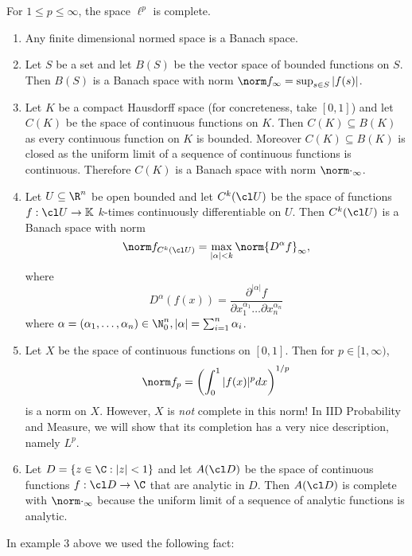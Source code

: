 \documentclass[a4paper]{article}
\newcommand{\K}{{\mathbb{K}}} %
\begin{document}
\begin{ex}
  For \(1 \leq p \leq \infty\), the space \(\ell^p\) is complete.
\end{ex}

\begin{eg}\leavevmode
  \begin{enumerate}
  \item Any finite dimensional normed space is a Banach space.
  \item Let \(S\) be a set and let \(B(S)\) be the vector space of bounded functions on \(S\). Then \(B(S)\) is a Banach space with norm \(\norm f_\infty = \sup_{s \in S} |f(s)|\).
  \item Let \(K\) be a compact Hausdorff space (for concreteness, take \([0, 1]\)) and let \(C(K)\) be the space of continuous functions on \(K\). Then \(C(K) \subseteq B(K)\) as every continuous function on \(K\) is bounded. Moreover \(C(K) \subseteq B(K)\) is closed as the uniform limit of a sequence of continuous functions is continuous. Therefore \(C(K)\) is a Banach space with norm \(\norm \cdot_\infty\).
  \item Let \(U \subseteq \R^n\) be open bounded and let \(C^k(\cl U)\) be the space of functions \(f: \cl U \to \K\) \(k\)-times continuously differentiable on \(U\). Then \(C^k(\cl U)\) is a Banach space with norm
    \[
      \norm f_{C^k(\cl U)} = \max_{|\alpha| < k} \norm{D^\alpha f}_\infty,
    \]
    where
    \[
      D^\alpha(f(x)) = \frac{\partial^{|\alpha|} f}{\partial x_1^{\alpha_1} \dots \partial x_n^{\alpha_n}}
    \]
    where \(\alpha = (\alpha_1, \dots, \alpha_n) \in \N_0^n, |\alpha| = \sum_{i = 1}^n \alpha_i\).
  \item Let \(X\) be the space of continuous functions on \([0, 1]\). Then for \(p \in [1, \infty)\),
    \[
      \norm f_p = \left( \int_0^1 |f(x)|^p dx \right)^{1/p}
    \]
    is a norm on \(X\). However, \(X\) is \emph{not} complete in this norm! In IID Probability and Measure, we will show that its completion has a very nice description, namely \(L^p\).
  \item Let \(D = \{z \in \C: |z| < 1\}\) and let \(A(\cl D)\) be the space of continuous functions \(f: \cl D \to \C\) that are analytic in \(D\). Then \(A(\cl D)\) is complete with \(\norm \cdot_\infty\) because the uniform limit of a sequence of analytic functions is analytic.
  \end{enumerate}
\end{eg}

In example 3 above we used the following fact:
\end{document}
